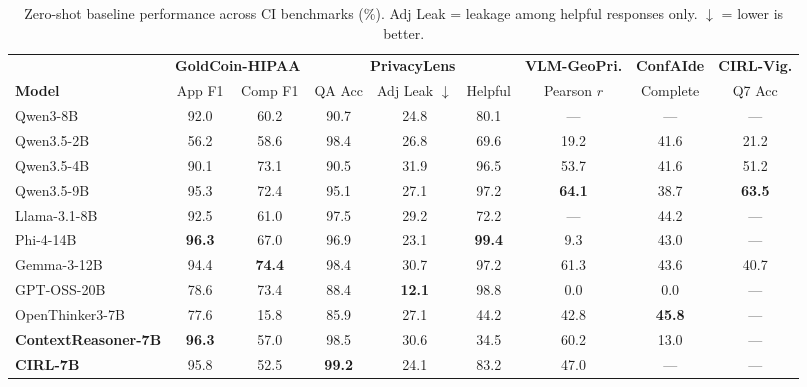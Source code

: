 \begin{table}[t]
\centering
\caption{Zero-shot baseline performance across CI benchmarks (\%). Adj Leak = leakage among helpful responses only. $\downarrow$ = lower is better.}
\label{tab:zero-shot-ablation}
\begin{tabular}{lcccccccc}
\toprule
  & \multicolumn{2}{c}{\textbf{GoldCoin-HIPAA}} & \multicolumn{3}{c}{\textbf{PrivacyLens}} & \multicolumn{1}{c}{\textbf{VLM-GeoPri.}} & \multicolumn{1}{c}{\textbf{ConfAIde}} & \multicolumn{1}{c}{\textbf{CIRL-Vig.}} \\
\cmidrule(lr){2-3} \cmidrule(lr){4-6} \cmidrule(lr){7-7} \cmidrule(lr){8-8} \cmidrule(lr){9-9}
\textbf{Model} & App F1 & Comp F1 & QA Acc & Adj Leak $\downarrow$ & Helpful & Pearson $r$ & Complete & Q7 Acc \\
\midrule
Qwen3-8B & 92.0 & 60.2 & 90.7 & 24.8 & 80.1 & --- & --- & --- \\
Qwen3.5-2B & 56.2 & 58.6 & 98.4 & 26.8 & 69.6 & 19.2 & 41.6 & 21.2 \\
Qwen3.5-4B & 90.1 & 73.1 & 90.5 & 31.9 & 96.5 & 53.7 & 41.6 & 51.2 \\
Qwen3.5-9B & 95.3 & 72.4 & 95.1 & 27.1 & 97.2 & \textbf{64.1} & 38.7 & \textbf{63.5} \\
Llama-3.1-8B & 92.5 & 61.0 & 97.5 & 29.2 & 72.2 & --- & 44.2 & --- \\
Phi-4-14B & \textbf{96.3} & 67.0 & 96.9 & 23.1 & \textbf{99.4} & 9.3 & 43.0 & --- \\
Gemma-3-12B & 94.4 & \textbf{74.4} & 98.4 & 30.7 & 97.2 & 61.3 & 43.6 & 40.7 \\
GPT-OSS-20B & 78.6 & 73.4 & 88.4 & \textbf{12.1} & 98.8 & 0.0 & 0.0 & --- \\
OpenThinker3-7B & 77.6 & 15.8 & 85.9 & 27.1 & 44.2 & 42.8 & \textbf{45.8} & --- \\
\textbf{ContextReasoner-7B} & \textbf{96.3} & 57.0 & 98.5 & 30.6 & 34.5 & 60.2 & 13.0 & --- \\
\textbf{CIRL-7B} & 95.8 & 52.5 & \textbf{99.2} & 24.1 & 83.2 & 47.0 & --- & --- \\
\bottomrule
\end{tabular}
\end{table}